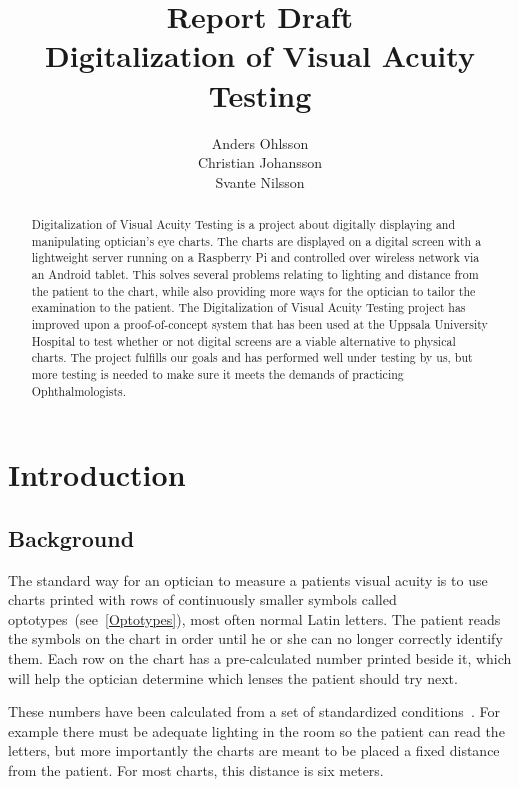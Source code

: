 \documentclass[12pt,a4paper,notitlepage]{report}
\begin{document}

\title{Report Draft\\Digitalization of Visual Acuity Testing}
\author{Anders Ohlsson\\Christian Johansson\\Svante Nilsson}
\maketitle

\begin{abstract}
Digitalization of Visual Acuity Testing is a project about digitally displaying and manipulating optician's eye charts. The charts are displayed on a digital screen with a lightweight server running on a Raspberry Pi and controlled over wireless network via an Android tablet. This solves several problems relating to lighting and distance from the patient to the chart, while also providing more ways for the optician to tailor the examination to the patient. The Digitalization of Visual Acuity Testing project has improved upon a proof-of-concept system that has been used at the Uppsala University Hospital to test whether or not digital screens are a viable alternative to physical charts. The project fulfills our goals and has performed well under testing by us, but more testing is needed to make sure it meets the demands of practicing Ophthalmologists. 
\end{abstract}

\tableofcontents
\listoffigures
\clearpage

\setcounter{page}{1}
\chapter{Introduction}
\section{Background}
The standard way for an optician to measure a patients visual acuity is to use charts printed with rows of continuously smaller symbols called optotypes~(see~\ref{Optotypes}), most often normal Latin letters. The patient reads the symbols on the chart in order until he or she can no longer correctly identify them. Each row on the chart has a pre-calculated number printed beside it, which will help the optician determine which lenses the patient should try next.

These numbers have been calculated from a set of standardized conditions~\cite{Bailey}. For example there must be adequate lighting in the room so the patient can read the letters, but more importantly the charts are meant to be placed a fixed distance from the patient. For most charts, this distance is six meters. 
\end{document}
